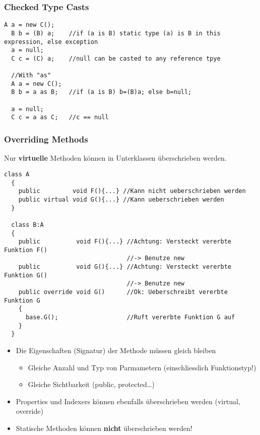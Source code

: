 \newpage
\subsubsection{Checked Type Casts}
\begin{lstlisting}[style=Csharp]
  A a = new C(); 
  B b = (B) a;    //if (a is B) static type (a) is B in this expression, else exception
  a = null; 
  C c = (C) a;    //null can be casted to any reference tpye
  
  //With "as"
  A a = new C();  
  B b = a as B;   //if (a is B) b=(B)a; else b=null;
  
  a = null; 
  C c = a as C;   //c == null
\end{lstlisting}

\subsubsection{Overriding Methods}
Nur \textbf{virtuelle} Methoden können in Unterklassen überschrieben werden. 
\begin{lstlisting}[style=Csharp]
  class A
  {
    public         void F(){...} //Kann nicht ueberschrieben werden 
    public virtual void G(){...} //Kann ueberschrieben werden
  }
  
  class B:A
  {
    public          void F(){...} //Achtung: Versteckt vererbte Funktion F()
                                  //-> Benutze new
    public          void G(){...} //Achtung: Versteckt vererbte Funktion G()
                                  //-> Benutze new
    public override void G()      //Ok: Ueberschreibt vererbte Funktion G
    {
      base.G();                   //Ruft vererbte Funktion G auf
    }
  }
\end{lstlisting}

\begin{itemize}
  \item Die Eigenschaften (Signatur) der Methode müssen gleich bleiben 
  \begin {itemize}
    \item Gleiche Anzahl und Typ von Parmametern (einschliesslich Funktionstyp!)
    \item Gleiche Sichtbarkeit (public, protected\ldots)
  \end{itemize}
  \item Properties und Indexers können ebenfalls überschrieben werden (virtual,
  override)
  \item Statische Methoden können \textbf{nicht} überschrieben werden!
\end{itemize}

